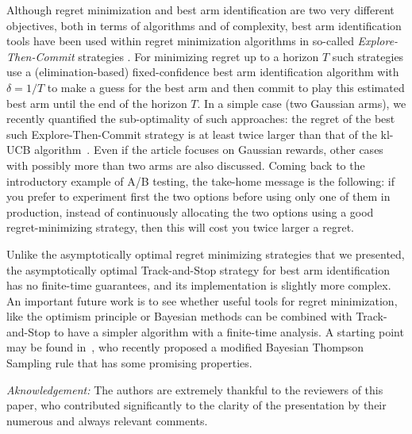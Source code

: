 \documentclass[proc]{edpsmath}
\begin{document}
	Although regret minimization and best arm identification are two very different objectives, both in terms of algorithms and of complexity, best arm identification tools have been used within regret minimization algorithms in so-called \emph{Explore-Then-Commit} strategies \cite{PerchetRigollet13Covariates,Perchet15Batched}. For minimizing regret up to a horizon $T$ such strategies use a (elimination-based) fixed-confidence best arm identification algorithm with $\delta=1/T$ to make a guess for the best arm and then commit to play this estimated best arm until the end of the horizon $T$. In a simple case (two Gaussian arms), we recently quantified the sub-optimality of such approaches: the regret of the best such Explore-Then-Commit strategy is at least twice larger than that of the kl-UCB algorithm~\cite{GKL16}. Even if the article focuses on Gaussian rewards, other cases with possibly more than two arms are also discussed. Coming back to the introductory example of A/B testing, the take-home message is the following: if you prefer to experiment first the two options before using only one of them in production, instead of continuously allocating the two options using a good regret-minimizing strategy, then this will cost you twice larger a regret. 
	
	Unlike the asymptotically optimal regret minimizing strategies that we presented, the asymptotically optimal Track-and-Stop strategy for best arm identification has no finite-time guarantees, and its implementation is slightly more complex. An important future work is to see whether useful tools for regret minimization, like the optimism principle or Bayesian methods can be combined with Track-and-Stop to have a simpler algorithm with a finite-time analysis. A starting point may be found in~\cite{Russo16}, who recently proposed a modified Bayesian Thompson Sampling rule that has some promising properties.
	
	\vspace{0.5cm}
	\noindent\textit{Aknowledgement:} The authors are extremely thankful to the reviewers of this paper, who contributed significantly to the clarity of the presentation by their numerous and always relevant comments. 
	
	
	
	
\end{document}
